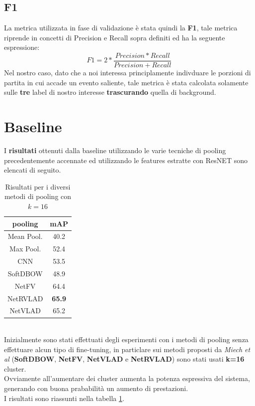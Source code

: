 \subsection{F1}
La metrica utilizzata in fase di validazione è stata quindi la \textbf{F1}, tale metrica riprende in concetti di Precision e Recall sopra definiti ed ha la seguente espressione:
\begin{equation}
F1=2*\frac{Precision * Recall}{Precision + Recall}
\label{F1}
\end{equation}
Nel nostro caso, dato che a noi interessa principlamente indivduare le porzioni di partita in cui accade un evento saliente, tale metrica è stata calcolata solamente sulle \textbf{tre} label di nostro interesse \textbf{trascurando} quella di background.
\section{Baseline}
I \textbf{risultati} ottenuti dalla baseline utilizzando le varie tecniche di pooling precedentemente accennate ed utilizzando le features estratte con ResNET sono elencati di seguito.
\begin{table}[ht]
\caption{Risultati per i diversi metodi di pooling con $k=16$}
\centering
\begin{tabular}{c| | c}
pooling & mAP \\
\hline
Mean Pool. & 40.2 \\
Max Pool. &  52.4\\
CNN & 53.5\\
SoftDBOW & 48.9\\
NetFV & 64.4\\
NetRVLAD & \textbf{65.9}\\
NetVLAD & 65.2\\ [1ex]

\end{tabular}
\label{table: baselinek16}
\end{table}
\\Inizialmente sono stati effettuati degli esperimenti con i metodi di pooling senza effettuare alcun tipo di fine-tuning, in particlare sui metodi proposti da \textit{Miech et al} (\textbf{SoftDBOW}, \textbf{NetFV}, \textbf{NetVLAD} e \textbf{NetRVLAD}) sono stati usati \textbf{k=16} cluster.
\\Ovviamente all'aumentare dei cluster aumenta la potenza espressiva del sistema, generando con buona prababilità un aumento di prestazioni.
\\I risultati sono riassunti nella tabella \ref{table: baselinek16}.
